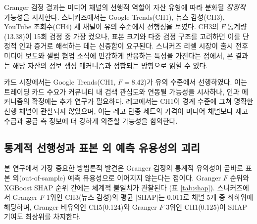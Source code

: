 \documentclass[11pt, a4paper, twocolumn]{article}
\begin{document}
Granger 검정 결과는 미디어 채널의 선행적 역할이 자산 유형에 따라 분화될
\emph{잠정적} 가능성을 시사한다. 스니커즈에서는 Google Trends(CH1),
뉴스 감성(CH3), YouTube 조회수(CH4) 세 채널이 유의 수준에서 선행성을
보였다. CH3의 $F$ 통계량(13.38)이 15회 검정 중 가장 컸으나, 표본 크기와
다중 검정 구조를 고려하면 이를 단정적 인과 증거로 해석하는 데는 신중함이
요구된다. 스니커즈 리셀 시장이 출시 전후 미디어 보도와 셀럽 협업 소식에
민감하게 반응하는 특성을 가진다는 점에서, 본 결과는 해당 자산의 정보
생성 메커니즘과 정합되는 방향으로 읽힐 수 있다.

카드 시장에서는 Google Trends(CH1, $F=8.42$)가 유의 수준에서 선행하였다.
이는 트레이딩 카드 수요가 커뮤니티 내 검색 관심도와 연동될 가능성을 시사하나,
인과 메커니즘의 확정에는 추가 연구가 필요하다. 레고에서는 CH1이 경계
수준에 그쳐 명확한 선행 채널이 관찰되지 않았으며, 이는 레고 단종 세트의
가격이 미디어 채널보다 재고 수급과 공급 측 정보에 더 강하게 의존할
가능성을 함의한다.

\subsection{통계적 선행성과 표본 외 예측 유용성의 괴리}
\label{sec:discussion-shapgranger}

본 연구에서 가장 중요한 방법론적 발견은 Granger 검정의 통계적 유의성이
곧바로 표본 외(out-of-sample) 예측 유용성으로 이어지지 않는다는 점이다.
Granger $F$ 순위와 XGBoost SHAP 순위 간에는 체계적 불일치가 관찰된다
(표 \ref{tab:shap}). 스니커즈에서 Granger $F$ 1위인 CH3(뉴스 감성)의
평균 $|\text{SHAP}|$는 0.011로 채널 5개 중 최하위에 해당하며, Granger
비유의인 CH5(0.124)와 Granger $F$ 3위인 CH1(0.125)이 SHAP 기여도
최상위를 차지한다.
\end{document}
